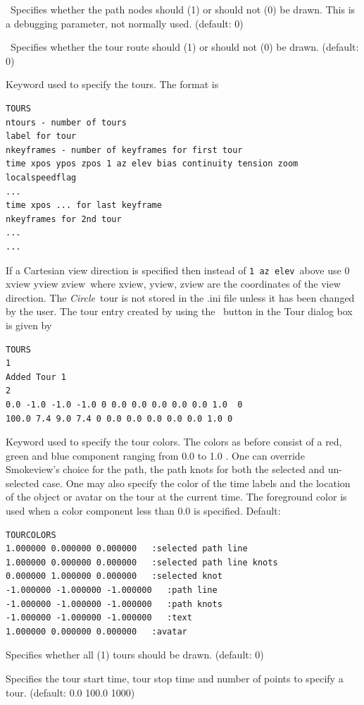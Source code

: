 \documentclass[11pt,twoside]{book}
\newcommand{\frameit}[1]{\fbox{\tt #1}}
\begin{document}
\ Specifies whether the path nodes should (1) or should not (0)
be drawn.  This is a debugging parameter, not normally used.  (default: 0)

\ Specifies whether the tour route should (1) or should not (0)
be drawn.  (default: 0)

Keyword used to specify the tours. The format is
\begin{lstlisting}
TOURS
ntours - number of tours
label for tour
nkeyframes - number of keyframes for first tour
time xpos ypos zpos 1 az elev bias continuity tension zoom localspeedflag
...
time xpos ... for last keyframe
nkeyframes for 2nd tour
...
...
\end{lstlisting}
If a Cartesian view direction is specified then instead of {\tt 1
az elev}\ above use {0 xview yview zview}\ where xview, yview, zview
are the coordinates of the view direction. The {\em Circle}\ tour
is not stored in the .ini file unless it has been changed by the
user.  The tour entry created by using the \frameit{Add}\ button
in the Tour dialog box is given by
\begin{lstlisting}
TOURS
1
Added Tour 1
2
0.0 -1.0 -1.0 -1.0 0 0.0 0.0 0.0 0.0 0.0 1.0  0
100.0 7.4 9.0 7.4 0 0.0 0.0 0.0 0.0 0.0 1.0 0
\end{lstlisting}

Keyword used to specify the tour colors.  The colors as before
consist of a red, green and blue component ranging from 0.0 to 1.0 .  One can override
Smokeview's choice for the path, the path knots for both the selected and un-selected
case.  One may also specify the color of the time labels and the location of the
object or avatar on the tour at the current time. The foreground color is used when a
color component less than 0.0 is specified.
Default:

\begin{lstlisting}
TOURCOLORS
1.000000 0.000000 0.000000   :selected path line
1.000000 0.000000 0.000000   :selected path line knots
0.000000 1.000000 0.000000   :selected knot
-1.000000 -1.000000 -1.000000   :path line
-1.000000 -1.000000 -1.000000   :path knots
-1.000000 -1.000000 -1.000000   :text
1.000000 0.000000 0.000000   :avatar
\end{lstlisting}

Specifies whether all (1) tours should be
drawn. (default: 0)

Specifies the tour start time, tour stop time and
number of points to specify a tour. (default: 0.0 100.0 1000)
\end{document}
